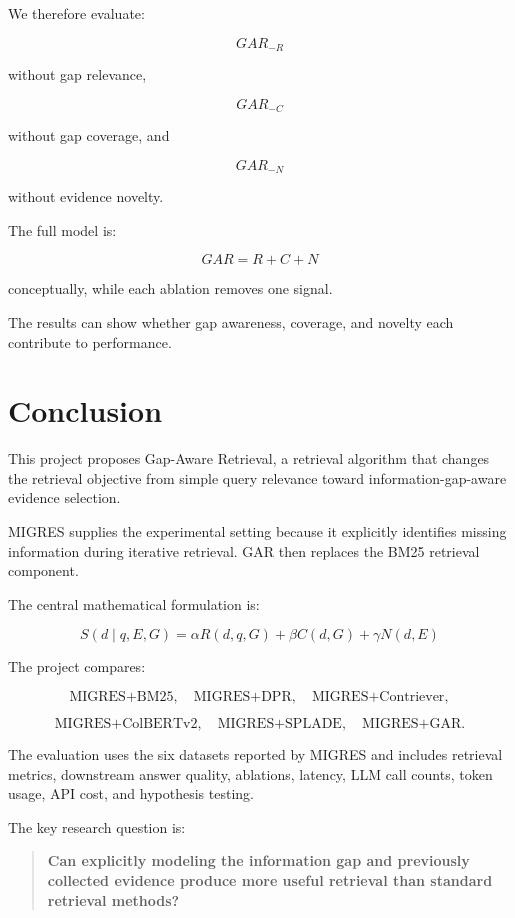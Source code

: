 \documentclass[11pt,a4paper]{article}
\begin{document}
We therefore evaluate:

\[
GAR_{-R}
\]

without gap relevance,

\[
GAR_{-C}
\]

without gap coverage, and

\[
GAR_{-N}
\]

without evidence novelty.

The full model is:

\[
GAR=R+C+N
\]

conceptually, while each ablation removes one signal.

The results can show whether gap awareness, coverage, and novelty each contribute to performance.


\section{Conclusion}

This project proposes Gap-Aware Retrieval, a retrieval algorithm that changes the retrieval objective from simple query relevance toward information-gap-aware evidence selection.

MIGRES supplies the experimental setting because it explicitly identifies missing information during iterative retrieval. GAR then replaces the BM25 retrieval component.

The central mathematical formulation is:

\[
\boxed{
S(d\mid q,E,G)
=
\alpha R(d,q,G)
+
\beta C(d,G)
+
\gamma N(d,E)
}
\]

The project compares:

\[
\text{MIGRES+BM25},
\quad
\text{MIGRES+DPR},
\quad
\text{MIGRES+Contriever},
\]

\[
\text{MIGRES+ColBERTv2},
\quad
\text{MIGRES+SPLADE},
\quad
\text{MIGRES+GAR}.
\]

The evaluation uses the six datasets reported by MIGRES and includes retrieval metrics, downstream answer quality, ablations, latency, LLM call counts, token usage, API cost, and hypothesis testing.

The key research question is:

\begin{quote}
\textbf{Can explicitly modeling the information gap and previously collected evidence produce more useful retrieval than standard retrieval methods?}
\end{quote}

\end{document}
